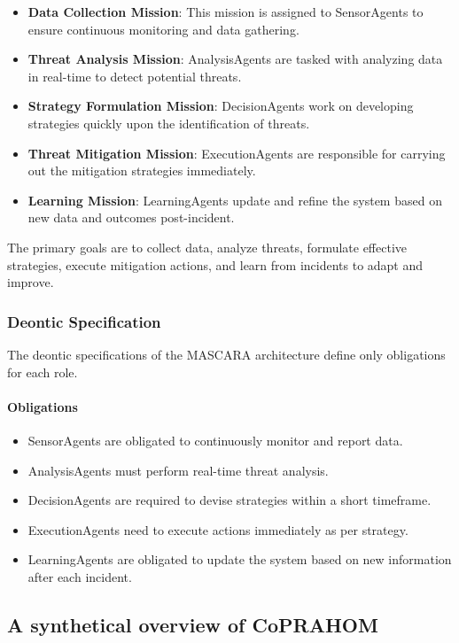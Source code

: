 \documentclass[conference]{IEEEtran}
\begin{document}
\begin{itemize}
    \item \textbf{Data Collection Mission}: This mission is assigned to SensorAgents to ensure continuous monitoring and data gathering.
    \item \textbf{Threat Analysis Mission}: AnalysisAgents are tasked with analyzing data in real-time to detect potential threats.
    \item \textbf{Strategy Formulation Mission}: DecisionAgents work on developing strategies quickly upon the identification of threats.
    \item \textbf{Threat Mitigation Mission}: ExecutionAgents are responsible for carrying out the mitigation strategies immediately.
    \item \textbf{Learning Mission}: LearningAgents update and refine the system based on new data and outcomes post-incident.
\end{itemize}

The primary goals are to collect data, analyze threats, formulate effective strategies, execute mitigation actions, and learn from incidents to adapt and improve.

\subsubsection*{Deontic Specification}

The deontic specifications of the MASCARA architecture define only obligations for each role.

\paragraph*{Obligations}

\begin{itemize}
    \item SensorAgents are obligated to continuously monitor and report data.
    \item AnalysisAgents must perform real-time threat analysis.
    \item DecisionAgents are required to devise strategies within a short timeframe.
    \item ExecutionAgents need to execute actions immediately as per strategy.
    \item LearningAgents are obligated to update the system based on new information after each incident.
\end{itemize}

\subsection{A synthetical overview of CoPRAHOM}
\end{document}
